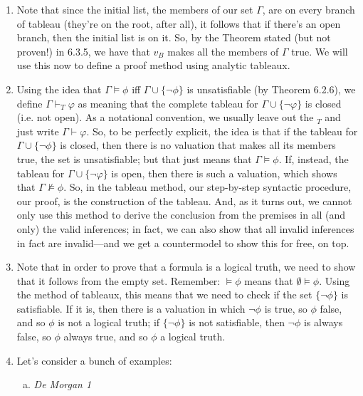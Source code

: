 \begin{enumerate}[\thesection.1]
		\item Note that since the initial list, the members of our set $\Gamma$, are on every branch of tableau (they're on the root, after all), it follows that if there's an open branch, then the initial list is on it. So, by the Theorem stated (but not proven!) in 6.3.5, we have that $v_B$ makes all the members of $\Gamma$ true. We will use this now to define a proof method using analytic tableaux.
		
		\item Using the idea that $\Gamma\vDash \phi$ iff $\Gamma\cup\{\neg\phi\}$ is unsatisfiable (by Theorem 6.2.6), we define $\Gamma\vdash_T \varphi$ as meaning that the complete tableau for $\Gamma\cup\{\neg\varphi\}$ is closed (i.e. not open). As a notational convention, we usually leave out the $_T$ and just write $\Gamma\vdash\varphi$. So, to be perfectly explicit, the idea is that if the tableau for $\Gamma\cup\{\neg\phi\}$ is closed, then there is no valuation that makes all its members true, the set is unsatisfiable; but that just means that $\Gamma\vDash\phi$. If, instead, the tableau for $\Gamma\cup\{\neg\varphi\}$ is open, then there is such a valuation, which shows that $\Gamma\nvDash\phi$. So, in the tableau method, our step-by-step syntactic procedure, our proof, is the construction of the tableau. And, as it turns out, we cannot only use this method to derive the conclusion from the premises in all (and only) the valid inferences; in fact, we can also show that all invalid inferences in fact are invalid---and we get a countermodel to show this for free, on top. 
		
		\item Note that in order to prove that a formula is a logical truth, we need to show that it follows from the empty set. Remember: $\vDash\phi$ means that $\emptyset\vDash\phi$. Using the method of tableaux, this means that we need to check if the set $\{\neg\phi\}$ is satisfiable. If it is, then there is a valuation in which $\neg\phi$ is true, so $\phi$ false, and so $\phi$ is not a logical truth; if $\{\neg\phi\}$ is not satisfiable, then $\neg\phi$ is always false, so $\phi$ always true, and so $\phi$ a logical truth.
		
		\item Let's consider a bunch of examples:
		
			\begin{enumerate}[(a)]
			
				\item \emph{De Morgan 1}
				

\end{enumerate}
\end{enumerate}
